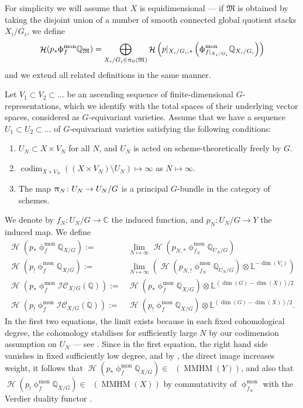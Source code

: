 \documentclass[a4paper,10pt]{amsart}
\newcommand{\Mst}{\mathfrak{M}}
\newcommand{\ICS}{\mathcal{IC}}
\newcommand{\phim}[1]{\phi^{\mon}_{#1}}
\renewcommand{\pi}{\uppi\hspace{0.05em}}
\renewcommand{\phi}{\upphi}
\DeclareMathOperator{\mon}{mon}
\DeclareMathOperator{\MMHM}{MMHM}
\DeclareMathOperator{\codim}{codim}
\DeclareMathOperator{\Ho}{\mathcal{H}}
\DeclareMathOperator{\Dulf}{\mathcal{D}^{\geq, lf}}
\DeclareMathOperator{\Dllf}{\mathcal{D}^{\leq, lf}}
\begin{document}
For simplicity we will assume that $X$ is equidimensional --- if $\Mst$ is obtained by taking the disjoint union of a number of smooth connected global quotient stacks $X_i/G_i$, we define 
\[
\Ho(p_*\phim{f}\mathbb{Q}_{\Mst})=\bigoplus_{X_i/G_i\in \pi_0(\Mst)}\Ho\left(p|_{X_i/G_i,*}\left(\phim{f|_{X_i/G_i}}\mathbb{Q}_{X_i/G_i}\right)\right)
\]
and we extend all related definitions in the same manner.  

Let $V_1\subset V_2\subset\ldots$ be an ascending sequence of finite-dimensional $G$-representations, which we identify with the total spaces of their underlying vector spaces, considered as $G$-equivariant varieties.  Assume that we have a sequence $U_1\subset U_2\subset\ldots$ of $G$-equivariant varieties satisfying the following conditions:
\begin{enumerate}
\item
$U_N\subset X\times V_N$ for all $N$, and $U_N$ is acted on scheme-theoretically freely by $G$.
\item
$\codim_{X\times V_N}\left((X\times V_N)\setminus U_N\right)\mapsto\infty$ as $N\mapsto \infty$.
\item
The map $\pi_N\colon U_N\rightarrow U_N/G$ is a principal $G$-bundle in the category of schemes.
\end{enumerate}
We denote by $f_N\colon U_N/G\rightarrow \mathbb{C}$ the induced function, and $p_N\colon U_N/G\rightarrow Y$ the induced map.  We define
\begin{align*}
\Ho(p_*\phim{f}\mathbb{Q}_{X/G}):=&\lim_{N\mapsto \infty}\Ho(p_{N,*}\phim{f_N}\mathbb{Q}_{U_N/G})\\
\Ho(p_!\phim{f}\mathbb{Q}_{X/G}):=&\lim_{N\mapsto \infty}\left(\Ho(p_{N,!}\phim{f_N}\mathbb{Q}_{U_N/G})\otimes \mathbb{L}^{-\dim(V_i)}\right)\\
\Ho(p_*\phim{f}\ICS_{X/G}(\mathbb{Q})):=&\Ho(p_*\phim{f}\mathbb{Q}_{X/G})\otimes\mathbb{L}^{(\dim(G)-\dim(X))/2}\\
\Ho(p_!\phim{f}\ICS_{X/G}(\mathbb{Q})):=&\Ho(p_!\phim{f}\mathbb{Q}_{X/G})\otimes\mathbb{L}^{(\dim(G)-\dim(X))/2}.
\end{align*}
In the first two equations, the limit exists because in each fixed cohomological degree, the cohomology stabilises for sufficiently large $N$ by our codimension assumption on $U_N$ --- see \cite[Sec.2]{DaMe15b}.  Since in the first equation, the right hand side vanishes in fixed sufficiently low degree, and by \cite[Prop.2.26]{Sai90}, the direct image increases weight, it follows that $\Ho(p_*\phim{f}\mathbb{Q}_{X/G})\in\Dulf(\MMHM(Y))$, and also that $\Ho(p_!\phim{f}\mathbb{Q}_{X/G})\in\Dllf(\MMHM(X))$ by commutativity of $\phi^{\mon}_{f_N}$ with the Verdier duality functor \cite{Sai89duality}.
\end{document}
